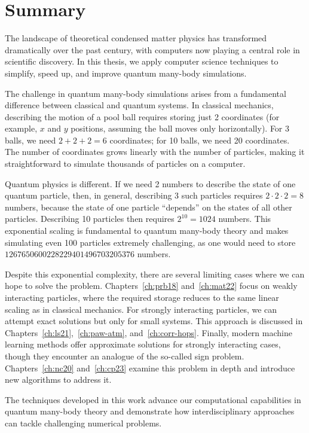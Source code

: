 \openleft\chapter{Summary}

The landscape of theoretical condensed matter physics has transformed dramatically over the past century, with computers now playing a central role in scientific discovery. In this thesis, we apply computer science techniques to simplify, speed up, and improve quantum many-body simulations.

The challenge in quantum many-body simulations arises from a fundamental difference between classical and quantum systems. In classical mechanics, describing the motion of a pool ball requires storing just 2 coordinates (for example, $x$ and $y$ positions, assuming the ball moves only horizontally). For 3 balls, we need $2+2+2=6$ coordinates; for 10 balls, we need 20 coordinates. The number of coordinates grows linearly with the number of particles, making it straightforward to simulate thousands of particles on a computer.

Quantum physics is different. If we need 2 numbers to describe the state of one quantum particle, then, in general, describing 3 such particles requires $2\cdot 2\cdot 2=8$ numbers, because the state of one particle ``depends'' on the states of all other particles. Describing 10 particles then requires $2^{10}=1024$ numbers. This exponential scaling is fundamental to quantum many-body theory and makes simulating even 100 particles extremely challenging, as one would need to store $1267650600228229401496703205376$ numbers.

Despite this exponential complexity, there are several limiting cases where we can hope to solve the problem. Chapters~\ref{ch:prb18} and~\ref{ch:mat22} focus on weakly interacting particles, where the required storage reduces to the same linear scaling as in classical mechanics. For strongly interacting particles, we can attempt exact solutions but only for small systems. This approach is discussed in Chapters~\ref{ch:ls21},~\ref{ch:paw-atm}, and~\ref{ch:corr-hops}. Finally, modern machine learning methods offer approximate solutions for strongly interacting cases, though they encounter an analogue of the so-called sign problem. Chapters~\ref{ch:nc20} and~\ref{ch:cp23} examine this problem in depth and introduce new algorithms to address it.

The techniques developed in this work advance our computational capabilities in quantum many-body theory and demonstrate how interdisciplinary approaches can tackle challenging numerical problems.
